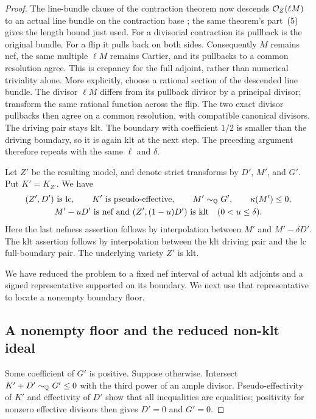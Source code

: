 \begin{proof}
The line-bundle clause of the contraction theorem now descends
$\mathcal O_Z(\ell M)$ to an actual line bundle on the contraction base
\cite[Theorem~1.1(4)(iii)]{Fujino2011}; the same theorem's part~(5)
gives the length bound just used. For a divisorial contraction its
pullback is the original bundle. For a flip it pulls back on both
sides. Consequently $M$ remains nef, the same multiple $\ell M$ remains Cartier, and its pullbacks to a common resolution agree. This is
crepancy for the full adjoint, rather than numerical triviality
alone. More explicitly, choose a rational section of the descended
line bundle. The divisor $\ell M$ differs from its pullback divisor
by a principal divisor; transform the same rational function across
the flip. The two exact divisor pullbacks then agree on a common
resolution, with compatible canonical divisors. The driving pair
stays klt. The boundary with coefficient
$1/2$ is smaller than the driving boundary, so it is again klt at
the next step. The preceding argument therefore repeats with the
same $\ell$ and $\delta$.

Let $Z'$ be the resulting model, and denote strict transforms by
$D'$, $M'$, and $G'$. Put $K'=K_{Z'}$. We have
\begin{equation}
\label{eq:signed-nef-interval}
 \begin{gathered}
 (Z',D')\text{ is lc},\qquad K'\text{ is pseudo-effective},
 \qquad M'\sim_{\mathbb Q}G',\qquad \kappa(M')\leq0,\\
 M'-uD'\text{ is nef and }(Z',(1-u)D')\text{ is klt}
 \quad(0<u\leq\delta).
 \end{gathered}
\end{equation}
Here the last nefness assertion follows by interpolation between
$M'$ and $M'-\delta D'$. The klt assertion follows by interpolation
between the klt driving pair and the lc full-boundary pair. The
underlying variety $Z'$ is klt.

We have reduced the problem to a fixed nef interval of actual klt
adjoints and a signed representative supported on its boundary.
We next use that representative to locate a nonempty boundary floor.

\subsection*{A nonempty floor and the reduced non-klt ideal}

Some coefficient of $G'$ is positive. Suppose otherwise. Intersect
$K'+D'\sim_{\mathbb Q}G'\leq0$ with the third power of an ample divisor.
Pseudo-effectivity of $K'$ and effectivity of $D'$ show that all
inequalities are equalities; positivity for nonzero effective
divisors then gives $D'=0$ and $G'=0$.


\end{proof}
